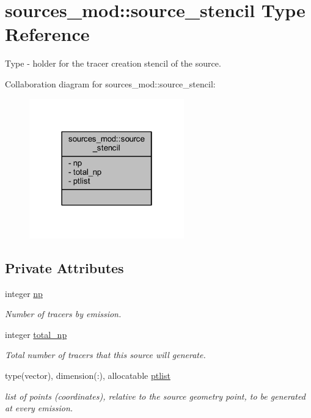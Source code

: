 \hypertarget{structsources__mod_1_1source__stencil}{}\section{sources\+\_\+mod\+:\+:source\+\_\+stencil Type Reference}
\label{structsources__mod_1_1source__stencil}


Type -\/ holder for the tracer creation stencil of the source.  




Collaboration diagram for sources\+\_\+mod\+:\+:source\+\_\+stencil\+:\nopagebreak
\begin{figure}[H]
\begin{center}
\leavevmode
\includegraphics[width=190pt]{structsources__mod_1_1source__stencil__coll__graph}
\end{center}
\end{figure}
\subsection*{Private Attributes}
\begin{DoxyCompactItemize}
\item 
integer \mbox{\hyperlink{structsources__mod_1_1source__stencil_a11ed46a8e923b5902cc02420d88158c5}{np}}
\begin{DoxyCompactList}\small\item\em Number of tracers by emission. \end{DoxyCompactList}\item 
integer \mbox{\hyperlink{structsources__mod_1_1source__stencil_ad7373d51bdf50a4595b6c0fa69f7f915}{total\+\_\+np}}
\begin{DoxyCompactList}\small\item\em Total number of tracers that this source will generate. \end{DoxyCompactList}\item 
type(vector), dimension(\+:), allocatable \mbox{\hyperlink{structsources__mod_1_1source__stencil_a154e50e2872650da574d0a1148e3065a}{ptlist}}
\begin{DoxyCompactList}\small\item\em list of points (coordinates), relative to the source geometry point, to be generated at every emission. \end{DoxyCompactList}\end{DoxyCompactItemize}


